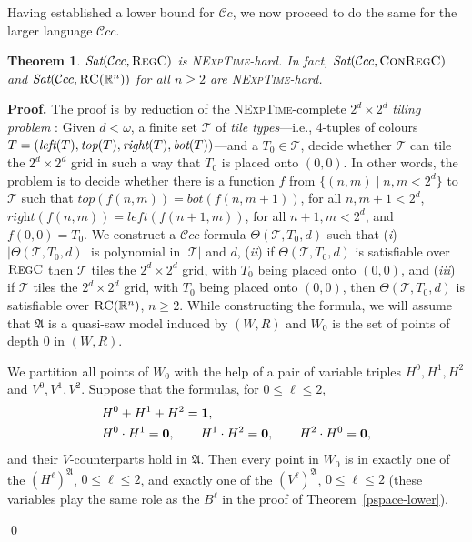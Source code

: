 \documentclass{LMCS}
\renewenvironment{proof}{\par\noindent\textbf{Proof.}}{\mbox{}\qed\par\medskip}
\theoremstyle{plain}
\newtheorem{theorem}[thm]{Theorem}
\newcommand{\cBC}{\ensuremath{\mathcal{C}}}
\newcommand{\cBCc}{\ensuremath{\cBC{}c}} \newcommand{\cBCcc}{\ensuremath{\cBC{}cc}}
\newcommand{\Sat}{\textit{Sat}}
\newcommand{\Regc}{\textsc{RegC}}
\newcommand{\ConR}{\textsc{ConRegC}}
\newcommand{\NExpTime}{\textsc{NExpTime}}
\begin{document}
Having established a lower bound for $\cBCc{}$, we now proceed to do
the same for the larger language $\cBCcc$.

\begin{theorem}\label{nexptime}
$\Sat(\cBCcc,\Regc)$ is \NExpTime{}-hard.
In fact,
$\Sat(
\cBCcc , \ConR)$ and $\Sat( \cBCcc , \RegC(\R^n))$ for all $n \geq 2$
are \NExpTime{}-hard.
\end{theorem}
\begin{proof}
The proof is by reduction of the \NExpTime-complete $2^d \times 2^d$
\emph{tiling problem} \cite{EmdeBoas97}: Given $d < \omega$, a finite set $\mathcal{T}$
of \emph{tile types}---i.e., 4-tuples of colours $T =
(\textit{left}(T),\textit{top}(T),\linebreak\textit{right}(T),
\textit{bot}(T))$---and a $T_0\in \mathcal{T}$, decide whether
$\mathcal{T}$ can tile the $2^d\times 2^d$ grid in such a way that
$T_0$ is placed onto $(0,0)$. In other words, the problem is to decide
whether there is a function $f$ from $\{(n,m) \mid n,m<2^d\}$ to
$\mathcal{T}$ such that $\textit{top}(f(n,m) ) =
\textit{bot}(f(n,m+1))$, for all $n, m+1<2^d$,
$\textit{right}(f(n,m)) = \textit{left}(f(n+1,m))$, for all $n+1,m<2^d$, and $f(0,0)=T_0$.
We construct a \cBCcc{}-formula $\Theta(\mathcal{T},T_0,d)$ such that
(\textit{i}) $|\Theta(\mathcal{T},T_0,d)|$ is polynomial in $|\mathcal{T}|$ and
$d$, (\textit{ii}) if $\Theta(\mathcal{T},T_0,d)$ is satisfiable over $\Regc$ then
$\mathcal{T}$ tiles the $2^d\times 2^d$ grid, with $T_0$ being
placed onto $(0,0)$, and (\textit{iii}) if
$\mathcal{T}$ tiles the $2^d\times 2^d$ grid, with $T_0$ being
placed onto $(0,0)$, then $\Theta(\mathcal{T},T_0,d)$ is satisfiable over $\textsc{RC}(\mathbb{R}^n)$, $n \geq 2$. While constructing the formula,
we will assume that $\mathfrak A$ is a quasi-saw model induced by
$(W,R)$ and $W_0$ is the set of points of
depth $0$ in $(W,R)$.

We partition all points
of $W_0$ with the help of a pair of variable
triples $H^0,H^1,H^2$ and $V^0,V^1,V^2$. Suppose that
the formulas, for $0 \leq \ell \leq 2$,
\begin{align}\label{eq:tiling:B}
& H^0 + H^1 + H^2 = \mathbf{1},\\
\label{eq:tiling:Ba}
& H^0 \cdot H^1 = \mathbf{0}, \qquad H^1 \cdot H^2 = \mathbf{0},\qquad H^2 \cdot H^0 = \mathbf{0},
\end{align}
and their $V$-counterparts hold in $\mathfrak{A}$.
Then every point in $W_0$ is in exactly
one of the $(H^\ell)^{\mathfrak A}$, $0 \leq \ell \leq 2$, and exactly one of the
$(V^\ell)^{\mathfrak A}$, $0 \leq \ell \leq 2$ (these variables play the same role as the $B^\ell$ in the proof of Theorem~\ref{pspace-lower}).


\end{proof}
\end{document}
